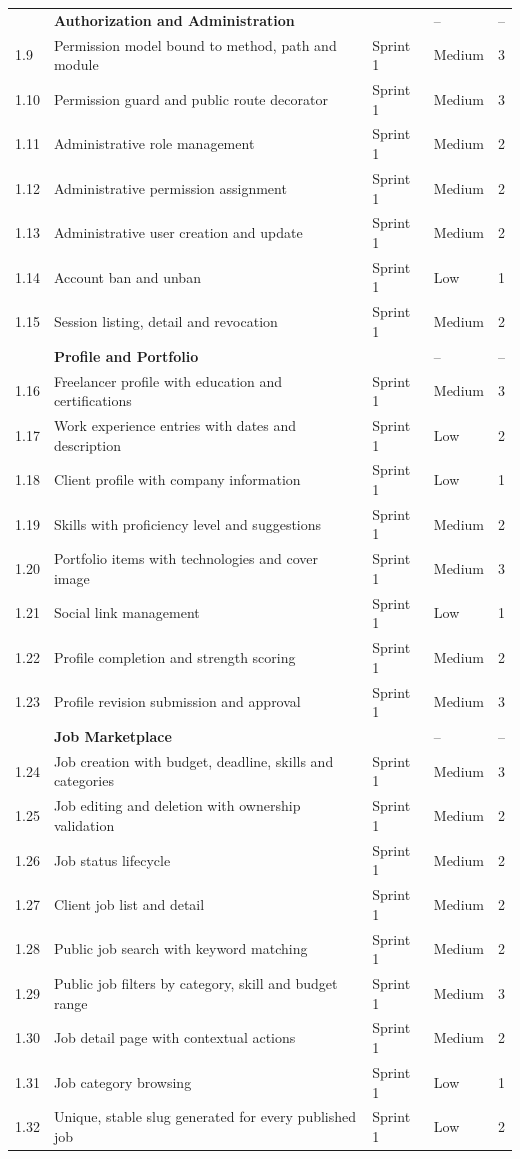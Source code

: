 \begin{longtable}{|
C{1.0cm}|
L{6.9cm}|
C{1.8cm}|
C{2.1cm}|
C{2.3cm}|}
 & \textbf{Authorization and Administration} &  & -- & -- \\
1.9 & Permission model bound to method, path and module & Sprint 1 & Medium & 3 \\
1.10 & Permission guard and public route decorator & Sprint 1 & Medium & 3 \\
1.11 & Administrative role management & Sprint 1 & Medium & 2 \\
1.12 & Administrative permission assignment & Sprint 1 & Medium & 2 \\
1.13 & Administrative user creation and update & Sprint 1 & Medium & 2 \\
1.14 & Account ban and unban & Sprint 1 & Low & 1 \\
1.15 & Session listing, detail and revocation & Sprint 1 & Medium & 2 \\
\hline

 & \textbf{Profile and Portfolio} &  & -- & -- \\
1.16 & Freelancer profile with education and certifications & Sprint 1 & Medium & 3 \\
1.17 & Work experience entries with dates and description & Sprint 1 & Low & 2 \\
1.18 & Client profile with company information & Sprint 1 & Low & 1 \\
1.19 & Skills with proficiency level and suggestions & Sprint 1 & Medium & 2 \\
1.20 & Portfolio items with technologies and cover image & Sprint 1 & Medium & 3 \\
1.21 & Social link management & Sprint 1 & Low & 1 \\
1.22 & Profile completion and strength scoring & Sprint 1 & Medium & 2 \\
1.23 & Profile revision submission and approval & Sprint 1 & Medium & 3 \\
\hline

 & \textbf{Job Marketplace} &  & -- & -- \\
1.24 & Job creation with budget, deadline, skills and categories & Sprint 1 & Medium & 3 \\
1.25 & Job editing and deletion with ownership validation & Sprint 1 & Medium & 2 \\
1.26 & Job status lifecycle & Sprint 1 & Medium & 2 \\
1.27 & Client job list and detail & Sprint 1 & Medium & 2 \\
1.28 & Public job search with keyword matching & Sprint 1 & Medium & 2 \\
1.29 & Public job filters by category, skill and budget range & Sprint 1 & Medium & 3 \\
1.30 & Job detail page with contextual actions & Sprint 1 & Medium & 2 \\
1.31 & Job category browsing & Sprint 1 & Low & 1 \\
1.32 & Unique, stable slug generated for every published job & Sprint 1 & Low & 2 \\
\hline


\end{longtable}
